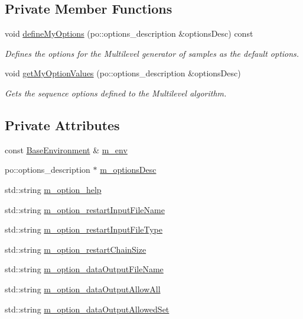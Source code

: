 \subsection*{Private Member Functions}
\begin{DoxyCompactItemize}
\item 
void \hyperlink{class_q_u_e_s_o_1_1_m_l_sampling_options_a36a5d0aab29603e955e3f942e5dc5cda}{define\-My\-Options} (po\-::options\-\_\-description \&options\-Desc) const 
\begin{DoxyCompactList}\small\item\em Defines the options for the Multilevel generator of samples as the default options. \end{DoxyCompactList}\item 
void \hyperlink{class_q_u_e_s_o_1_1_m_l_sampling_options_a209b2e0cf3fdaa85add4d04f8cf602a1}{get\-My\-Option\-Values} (po\-::options\-\_\-description \&options\-Desc)
\begin{DoxyCompactList}\small\item\em Gets the sequence options defined to the Multilevel algorithm. \end{DoxyCompactList}\end{DoxyCompactItemize}
\subsection*{Private Attributes}
\begin{DoxyCompactItemize}
\item 
const \hyperlink{class_q_u_e_s_o_1_1_base_environment}{Base\-Environment} \& \hyperlink{class_q_u_e_s_o_1_1_m_l_sampling_options_a28d73f222e9b20f1c749ed808f69eebd}{m\-\_\-env}
\item 
po\-::options\-\_\-description $\ast$ \hyperlink{class_q_u_e_s_o_1_1_m_l_sampling_options_afc13079420db3e2c7eaf97ca4d44cc97}{m\-\_\-options\-Desc}
\item 
std\-::string \hyperlink{class_q_u_e_s_o_1_1_m_l_sampling_options_a5239a6e156de70d1f64b90e5885556d5}{m\-\_\-option\-\_\-help}
\item 
std\-::string \hyperlink{class_q_u_e_s_o_1_1_m_l_sampling_options_a0fbc7946acb9944500d92503a1a0feaf}{m\-\_\-option\-\_\-restart\-Input\-File\-Name}
\item 
std\-::string \hyperlink{class_q_u_e_s_o_1_1_m_l_sampling_options_a3fa31b5691319385226e2149b549e269}{m\-\_\-option\-\_\-restart\-Input\-File\-Type}
\item 
std\-::string \hyperlink{class_q_u_e_s_o_1_1_m_l_sampling_options_ad37df327253d40983ac3e3ed880069c3}{m\-\_\-option\-\_\-restart\-Chain\-Size}
\item 
std\-::string \hyperlink{class_q_u_e_s_o_1_1_m_l_sampling_options_a3950ebf354b0ff038c3e0b5c2cc2efa9}{m\-\_\-option\-\_\-data\-Output\-File\-Name}
\item 
std\-::string \hyperlink{class_q_u_e_s_o_1_1_m_l_sampling_options_af2f225d4068ab602b17ae28242596ddd}{m\-\_\-option\-\_\-data\-Output\-Allow\-All}
\item 
std\-::string \hyperlink{class_q_u_e_s_o_1_1_m_l_sampling_options_a0dc0efc965101db9b18888c3db5bef99}{m\-\_\-option\-\_\-data\-Output\-Allowed\-Set}
\end{DoxyCompactItemize}


